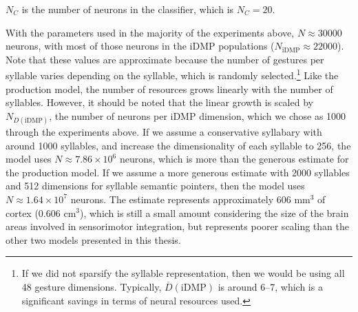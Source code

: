 $N_C$ is the number of neurons
in the classifier,
which is $N_C = 20$.

With the parameters used
in the majority of the experiments above,
$N\approx 30000$ neurons,
with most of those neurons
in the iDMP populations
($N_{\text{iDMP}}\approx 22000$).
Note that these values are approximate
because the number of gestures per syllable
varies depending on the syllable,
which is randomly selected.\footnote{
  If we did not sparsify the syllable representation,
  then we would be using all 48 gesture dimensions.
  Typically, $\overline{D}(\text{iDMP})$ is around 6--7,
  which is a significant savings in terms
  of neural resources used.}
Like the production model,
the number of resources
grows linearly with the number of syllables.
However, it should be noted that the
linear growth is scaled by
$N_{D(\text{iDMP})}$,
the number of neurons per iDMP dimension,
which we chose as 1000 through the experiments above.
If we assume a conservative syllabary
with around 1000 syllables,
and increase the dimensionality
of each syllable to 256,
the model uses
$N \approx 7.86 \times 10^6$ neurons,
which is more than the generous
estimate for the production model.
If we assume a more generous estimate
with 2000 syllables
and 512 dimensions
for syllable semantic pointers,
then the model uses
$N \approx 1.64 \times 10^7$ neurons.
The estimate represents approximately
606 mm$^3$ of cortex (0.606 cm$^3$),
which is still a small amount
considering the size of the brain areas
involved in sensorimotor integration,
but represents poorer scaling
than the other two models presented in this thesis.
